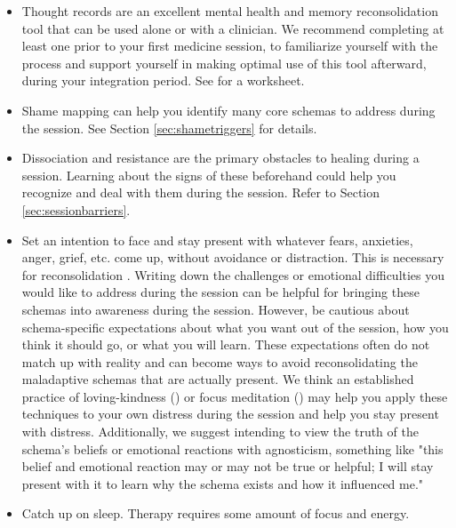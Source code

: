 \documentclass[12pt,letterpaper]{book}
\begin{document}
\begin{itemize}
    \item Thought records are an excellent mental health and memory reconsolidation tool that can be used alone or with a clinician. We recommend completing at least one prior to your first medicine session, to familiarize yourself with the process and support yourself in making optimal use of this tool afterward, during your integration period. See \textcite{harperThought} for a worksheet.
    \item Shame mapping can help you identify many core schemas to address during the session. See Section \ref{sec:shametriggers} for details.
    \item Dissociation and resistance are the primary obstacles to healing during a session. Learning about the signs of these beforehand could help you recognize and deal with them during the session. Refer to Section \ref{sec:sessionbarriers}.
    \item Set an intention to face and stay present with whatever fears, anxieties, anger, grief, etc. come up, without avoidance or distraction. This is necessary for reconsolidation \cite{eckerUnlocking}. Writing down the challenges or emotional difficulties you would like to address during the session can be helpful for bringing these schemas into awareness during the session. However, be cautious about schema-specific expectations about what you want out of the session, how you think it should go, or what you will learn. These expectations often do not match up with reality and can become ways to avoid reconsolidating the maladaptive schemas that are actually present. We think an established practice of loving-kindness (\textcite{lkMeditation}) or focus meditation (\textcite{rain}) may help you apply these techniques to your own distress during the session and help you stay present with distress. Additionally, we suggest intending to view the truth of the schema's beliefs or emotional reactions with agnosticism, something like "this belief and emotional reaction may or may not be true or helpful; I will stay present with it to learn why the schema exists and how it influenced me."
    \item Catch up on sleep. Therapy requires some amount of focus and energy.

\end{itemize}
\end{document}
